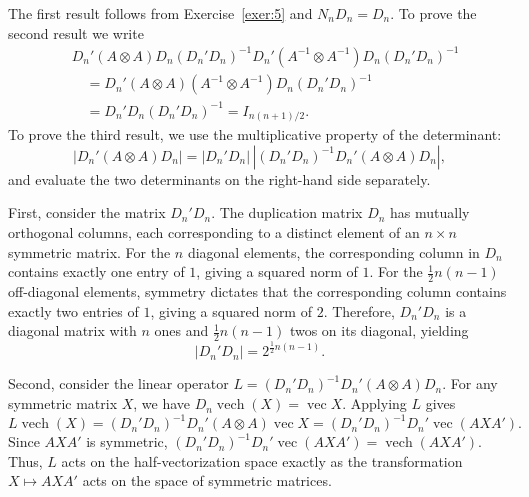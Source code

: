 \documentclass[12pt,a4paper]{article}
\makeatletter
\theoremstyle{definition}
\renewenvironment{proof}[1][\proofname]{\par
  \pushQED{\qed}%
  \normalfont \topsep6\p@\@plus6\p@\relax
  \trivlist
  \item[\hskip\labelsep\bfseries #1\@addpunct{.}]\ignorespaces
}{%
  \popQED\endtrivlist\@endpefalse
}
\DeclareMathOperator{\vech}{vech}
\DeclareMathOperator{\avec}{vec}
\makeatother
\begin{document}
\begin{proof}
The first result follows from Exercise~\ref{exer:5} and $N_n D_n = D_n$. To prove the second result we write
\begin{align*}
&D_n'(A \otimes A)D_n (D_n'D_n)^{-1} D_n'(A^{-1} \otimes A^{-1})D_n(D_n'D_n)^{-1} \\
&\quad= D_n'(A \otimes A)(A^{-1} \otimes A^{-1})D_n(D_n'D_n)^{-1} \\
&\quad= D_n'D_n(D_n'D_n)^{-1} = I_{n(n+1)/2}.
\end{align*}
To prove the third result, we use the multiplicative property of the determinant:
\[
|D_n'(A \otimes A)D_n| = |D_n'D_n| \, |(D_n'D_n)^{-1} D_n'(A \otimes A)D_n|,
\]
and evaluate the two determinants on the right-hand side separately.

First, consider the matrix $D_n'D_n$. The duplication matrix $D_n$ has mutually orthogonal columns, each corresponding to a distinct element of an $n \times n$ symmetric matrix. For the $n$ diagonal elements, the corresponding column in $D_n$ contains exactly one entry of $1$, giving a squared norm of $1$. For the $\frac{1}{2}n(n-1)$ off-diagonal elements, symmetry dictates that the corresponding column contains exactly two entries of $1$, giving a squared norm of $2$. Therefore, $D_n'D_n$ is a diagonal matrix with $n$ ones and $\frac{1}{2}n(n-1)$ twos on its diagonal, yielding
\[
|D_n'D_n| = 2^{\frac{1}{2}n(n-1)}.
\]

Second, consider the linear operator $L = (D_n'D_n)^{-1}D_n'(A \otimes A)D_n$. For any symmetric matrix $X$, we have $D_n \vech(X) = \avec X$. Applying $L$ gives
\[
L \vech(X) = (D_n'D_n)^{-1}D_n'(A \otimes A)\avec X = (D_n'D_n)^{-1}D_n'\avec(AXA').
\]
Since $AXA'$ is symmetric, $(D_n'D_n)^{-1}D_n'\avec(AXA') = \vech(AXA')$. Thus, $L$ acts on the half-vectorization space exactly as the transformation $X \mapsto AXA'$ acts on the space of symmetric matrices.


\end{proof}
\end{document}
